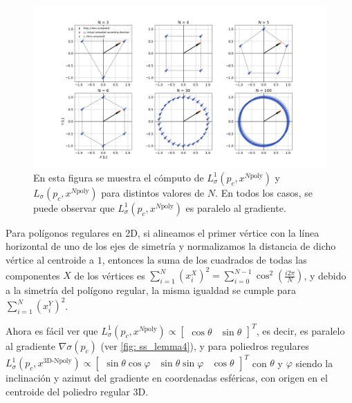 \newpage

\begin{figure}[!h]
\centering
\includegraphics[trim={0 0 0 0}, clip, width=1\columnwidth]{./fig/lemma4.png}
\caption{En esta figura se muestra el cómputo de $L^1_\sigma(p_c, x^{N\text{poly}})$ y $L_\sigma(p_c, x^{N\text{poly}})$ para distintos valores de $N$. En todos los casos, se puede observar que $L^1_\sigma(p_c, x^{N\text{poly}})$ es paralelo al gradiente.}
\label{fig: ss_lemma4}
\end{figure}  

Para polígonos regulares en 2D, si alineamos el primer vértice con la línea horizontal de uno de los ejes de simetría y normalizamos la distancia de dicho vértice al centroide a $1$, entonces la suma de los cuadrados de todas las componentes $X$ de los vértices es $\sum_{i=1}^N (x_i^X)^2 = \sum_{i=0}^{N-1} \cos^2(\frac{i2\pi}{N})$, y debido a la simetría del polígono regular, la misma igualdad se cumple para $\sum_{i=1}^{N} (x_i^Y)^2$.


Ahora es fácil ver que $L^1_\sigma(p_c, x^{N\text{poly}}) \propto \left[\begin{smallmatrix}\cos\theta & \sin\theta \end{smallmatrix}\right]^T$, es decir, es paralelo al gradiente $\nabla\sigma(p_c)$ (ver \autoref{fig: ss_lemma4}), y para poliedros regulares $L^1_\sigma(p_c, x^{\text{3D-Npoly}}) \propto \left[\begin{smallmatrix}\sin\theta \cos\varphi & \sin\theta \sin\varphi & \cos\theta \end{smallmatrix}\right]^T$ con $\theta$ y $\varphi$ siendo la inclinación y azimut del gradiente en coordenadas esféricas, con origen en el centroide del poliedro regular 3D. 

